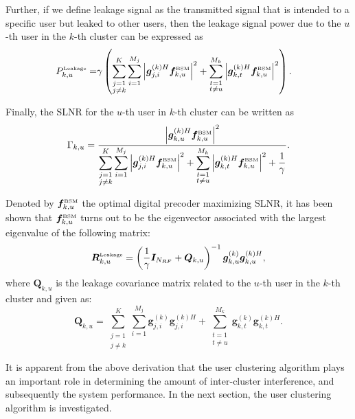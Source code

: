 \documentclass[conference]{IEEEtran}
\begin{document}
{Further, if we define leakage signal as the transmitted signal that is intended to a specific user but leaked to other users, then the leakage signal power due to the $u$-th user in the $k$-th cluster can be expressed as
\begin{align}
P^{\tiny\mbox{Leakage}}_{k,u}  = &\gamma\left(\sum_{\substack{j=1\\j\neq k}}^{K}\sum_{i=1}^{M_j}\left|\bm{g}_{j,i}^{(k)H} \bm{f}^{\tiny\mbox{BSM}}_{k,u}\right|^2+ \sum_{\substack{t=1\\t\neq u}}^{M_k}\left|\bm{g}_{k,t}^{(k)H} \bm{f}^{\tiny\mbox{BSM}}_{k,u}\right|^2\right).
\end{align}

Finally, the SLNR for the $u$-th user in $k$-th cluster can be written as
\begin{equation}\label{eq:slnr}
\Gamma_{k,u} = \frac{\left|\bm{g}_{k,u}^{(k)H}  \bm{f}^{\tiny\mbox{BSM}}_{k,u}\right|^2}{\displaystyle\sum_{\substack{j=1\\j\neq k}}^{K}\displaystyle\sum_{i=1}^{M_j}\left|\bm{g}_{j,i}^{(k)H} \bm{f}^{\tiny\mbox{BSM}}_{k,u}\right|^2+ \displaystyle\sum_{\substack{t=1\\t\neq u}}^{M_k}\left|\bm{g}_{k,t}^{(k)H} \bm{f}^{\tiny\mbox{BSM}}_{k,u}\right|^2+{1\over \gamma}}.
\end{equation}

Denoted by $\bm{f}^{\tiny\mbox{BSM}}_{k,u}$ the optimal digital precoder maximizing SLNR, it has been shown that $\bm{f}^{\tiny\mbox{BSM}}_{k,u}$ turns out to be the eigenvector associated with the largest eigenvalue of the following matrix\cite{wang2012statistical}:
\begin{equation}\small
{\bm R}^{\tiny\mbox{Leakage}}_{k,u}=\left(\frac{1}{\gamma}\bm{I}_{N_{RF}}+\bm{Q}_{k,u} \right)^{-1}{\bm{g}}_{k,u}^{(k)}{\bm{g}}_{k,u}^{(k)H},
\end{equation}
where $\bm{Q}_{k,u}$ is the leakage covariance matrix related to the $u$-th user in the $k$-th cluster and given as:
\begin{equation}
\bm{Q}_{k,u}=\displaystyle\sum_{\substack{j=1\\j\neq k}}^{K}\displaystyle\sum_{i=1}^{M_j}\bm{g}_{j,i}^{(k)}\bm{g}_{j,i}^{(k)H} + \displaystyle\sum_{\substack{t=1\\t\neq u}}^{M_k}\bm{g}_{k,t}^{(k)} \bm{g}_{k,t}^{(k)H}.
\end{equation}

It is apparent from the above derivation that the user clustering algorithm plays an important role in determining the amount of inter-cluster interference, and subsequently the system performance. In the next section, the user clustering algorithm is investigated.

}
\end{document}
